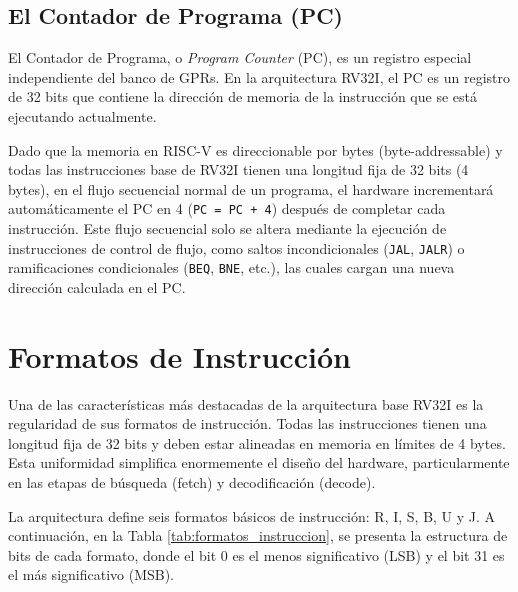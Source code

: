 \subsection{El Contador de Programa (PC)}
El Contador de Programa, o \textit{Program Counter} (PC), es un registro especial independiente del banco de GPRs. En la arquitectura RV32I, el PC es un registro de 32 bits que contiene la dirección de memoria de la instrucción que se está ejecutando actualmente. 

Dado que la memoria en RISC-V es direccionable por bytes (byte-addressable) y todas las instrucciones base de RV32I tienen una longitud fija de 32 bits (4 bytes), en el flujo secuencial normal de un programa, el hardware incrementará automáticamente el PC en 4 (\texttt{PC = PC + 4}) después de completar cada instrucción. Este flujo secuencial solo se altera mediante la ejecución de instrucciones de control de flujo, como saltos incondicionales (\texttt{JAL}, \texttt{JALR}) o ramificaciones condicionales (\texttt{BEQ}, \texttt{BNE}, etc.), las cuales cargan una nueva dirección calculada en el PC.


\section{Formatos de Instrucción}
\label{sec:FormatosInstruccion}

Una de las características más destacadas de la arquitectura base RV32I es la regularidad de sus formatos de instrucción. Todas las instrucciones tienen una longitud fija de 32 bits y deben estar alineadas en memoria en límites de 4 bytes. Esta uniformidad simplifica enormemente el diseño del hardware, particularmente en las etapas de búsqueda (fetch) y decodificación (decode).

La arquitectura define seis formatos básicos de instrucción: R, I, S, B, U y J. A continuación, en la Tabla \ref{tab:formatos_instruccion}, se presenta la estructura de bits de cada formato, donde el bit 0 es el menos significativo (LSB) y el bit 31 es el más significativo (MSB).



